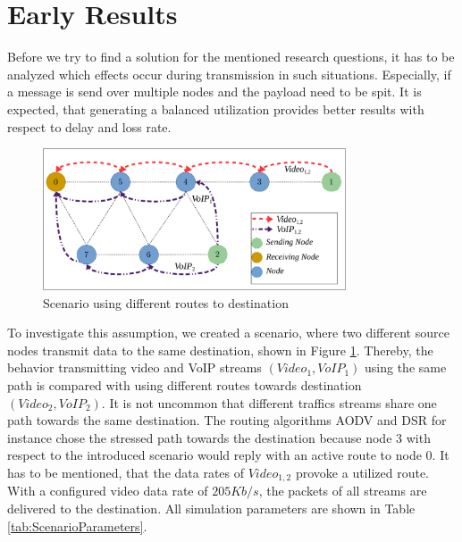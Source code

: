 \documentclass[runningheads]{llncs}
\newcommand{\VOIP}{VoIP}
\begin{document}
	\section{Early Results}
	Before we try to find a solution for the mentioned research questions, it has to be analyzed which effects occur during transmission in such situations. Especially, if a message is send over multiple nodes and the payload need to be spit. It is expected, that generating a balanced utilization provides better results with respect to delay and loss rate.
	\begin{figure}[h]
		\centering
		\includegraphics[width=0.8\textwidth]{figures/ScenarioBoth.pdf}
		\caption{Scenario using different routes to destination}
		\label{fig:ScenarioBoth}
	\end{figure}
	To investigate this assumption, we created a scenario, where two different source nodes transmit data to the same destination, shown in Figure \ref{fig:ScenarioBoth}.
	Thereby, the behavior transmitting video and \VOIP{} streams $(Video_1,\VOIP{}_1)$ using the same path is compared with using different routes towards destination $(Video_2,\VOIP{}_2)$.
	It is not uncommon that different traffics streams share one path towards the same destination. The routing algorithms AODV \cite{EvaluationAODV} and DSR \cite{Evaluation:DSR} for instance chose the stressed path towards the destination because node $3$ with respect to the introduced scenario would reply with an active route to node $0$. It has to be mentioned, that the data rates of $Video_{1,2}$ provoke a utilized route. With a configured video data rate of $205Kb/s$, the packets of all streams are delivered to the destination. All simulation parameters are shown in Table \ref{tab:ScenarioParameters}.
\end{document}
